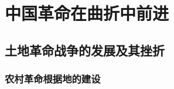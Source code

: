 \documentclass[10pt, UTF8]{book} %
\begin{document}







\section{中国革命在曲折中前进}

\subsection{土地革命战争的发展及其挫折}

\subsubsection{农村革命根据地的建设}
\end{document}
